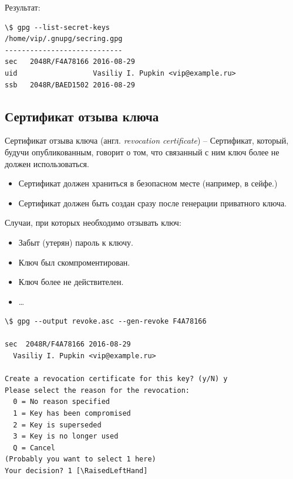 \documentclass[presentation]{beamer}
\newcommand{\RaisedLeftHand}{%
  \raisebox{-.50em}{\Large\HandLeft}
}
\newcommand{\EndOfSectionOrnament}{
  \begin{center}
    \pgfornament[width=0.5\textwidth]{88}
    \end{center}
}
\begin{document}
\begin{frame}[fragile]{}
  Результат:
  \begin{Verbatim}[commandchars=\\\[\]]
\$ gpg --list-secret-keys
/home/vip/.gnupg/secring.gpg
----------------------------
sec   2048R/F4A78166 2016-08-29
uid                  Vasiliy I. Pupkin <vip@example.ru>
ssb   2048R/BAED1502 2016-08-29
  \end{Verbatim}
  \EndOfSectionOrnament
\end{frame}



\subsection{Сертификат отзыва ключа}

\begin{frame}[fragile]{}
  \raisebox{-.30em}{\Large\HandRight}\hspace{.25em} Сертификат отзыва
  ключа (англ. \emph{revocation certificate}) -- Сертификат, который,
  будучи опубликованным, говорит о том, что связанный с ним ключ более
  не должен использоваться.\newline

  \begin{itemize}
  \item Сертификат должен храниться в безопасном месте (например, в
    сейфе.)
  \item Сертификат должен быть создан сразу после генерации приватного
    ключа.\newline
  \end{itemize}
  
  Случаи, при которых необходимо отзывать ключ:
  \begin{itemize}
  \item Забыт (утерян) пароль к ключу.
  \item Ключ был скомпроментирован.
  \item Ключ более не действителен.
  \item \ldots{}
  \end{itemize}
\end{frame}

\begin{frame}[fragile]{}
  \small
\begin{Verbatim}[commandchars=\\\[\]]
\$ gpg --output revoke.asc --gen-revoke F4A78166

sec  2048R/F4A78166 2016-08-29
  Vasiliy I. Pupkin <vip@example.ru>

Create a revocation certificate for this key? (y/N) y
Please select the reason for the revocation:
  0 = No reason specified
  1 = Key has been compromised
  2 = Key is superseded
  3 = Key is no longer used
  Q = Cancel
(Probably you want to select 1 here)
Your decision? 1 [\RaisedLeftHand]
\end{Verbatim}
\normalsize
\EndOfSectionOrnament
\end{frame}
\end{document}
